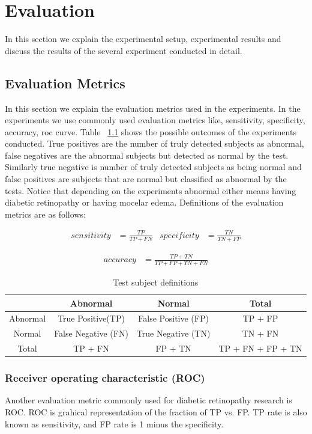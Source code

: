 \chapter{Evaluation}

In this section we explain the experimental setup, experimental results and discuss the results of the several experiment conducted in detail. 

\section{Evaluation Metrics}
In this section we explain the evaluation metrics used in the experiments. In the experiments we use commonly used evaluation metrics like, sensitivity, specificity, accuracy, roc curve. Table ~\ref{tab:configs} shows the possible outcomes of the experiments conducted. True positives are the number of truly detected subjects as abnormal, false negatives are the abnormal subjects but detected as normal by the test. Similarly true negative is number of truly detected subjects as being normal and false positives are subjects that are normal but classified as abnormal by the tests. Notice that depending on the experiments abnormal either means having diabetic retinopathy or having mocelar edema. Definitions of the evaluation metrics are as follows: 

\begin{align*}
    sensitivity &= \frac{TP}{TP + FN}
    &
    specificity &= \frac{TN}{TN + FP}
\end{align*}

\begin{align*}
    accuracy &= \frac{TP + TN}{TP + FP + TN + FN}
\end{align*}

\begin{table}[t]
\centering
\caption{Test subject definitions} 
\label{tab:configs}
\begin{tabular}{|c|c|c|c|} \hline
     & Abnormal & Normal & Total  \\ \hline
     Abnormal& True Positive(TP) & False Positive (FP) & TP + FP \\ \hline
     Normal & False Negative (FN) & True Negative (TN) & TN + FN \\ \hline
     Total & TP + FN &  FP + TN & TP + FN + FP + TN \\ \hline
\end{tabular}
\end{table}

\subsection{Receiver operating characteristic (ROC)}
Another evaluation metric commonly used for diabetic retinopathy research is ROC. ROC is grahical representation of the fraction of TP  vs. FP. TP rate is also known as sensitivity, and FP rate is 1 minus the specificity. 

